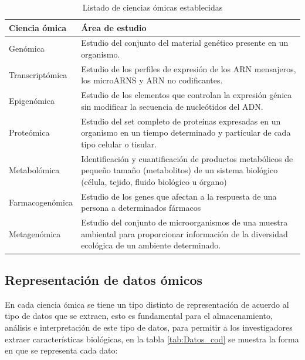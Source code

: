 \begin{table}[!h]
    \scriptsize
    \centering
    \caption{Listado de ciencias ómicas establecidas}
    
    \begin{tabular}{
    >{\centering\arraybackslash}m{4cm} 
    >{\centering\arraybackslash}m{9cm}}
\hline 
        \textbf{Ciencia ómica} & 
        \textbf{Área de estudio}
\\      
    \hline \hline 

    Genómica &
    Estudio del conjunto del material genético presente en un organismo.
\\
    \hline
    Transcriptómica &
    Estudio de los perfiles de expresión de los ARN mensajeros, los microARNS y ARN no codificantes.
\\
    \hline
    Epigenómica &
    Estudio de los elementos que controlan la expresión génica sin modificar la secuencia de nucleótidos del ADN.
\\
    \hline
     Proteómica &
     Estudio del set completo de proteínas expresadas en un organismo en un tiempo determinado y particular de cada tipo celular o tisular.
\\
     \hline
     Metabolómica &
     Identificación y cuantificación de productos metabólicos de pequeño tamaño (metabolitos) de un sistema biológico (célula, tejido, fluido biológico u órgano)
\\
     \hline
     Farmacogenómica &
     Estudio de los genes que afectan a la respuesta de una persona a determinados fármacos
\\
     \hline
     Metagenómica &
     Estudio del conjunto de microorganismos de una muestra ambiental para proporcionar información de la diversidad ecológica de un ambiente determinado.
\\
    
\hline
    \end{tabular}
    \label{tab:List_omic}
\end{table}

\subsection{Representación de datos ómicos}

En cada ciencia ómica se tiene un tipo distinto de representación de acuerdo al tipo de datos que se extraen, esto es fundamental para el almacenamiento, análisis e interpretación de este tipo de datos, para permitir a los investigadores extraer características biológicas, en la tabla \ref{tab:Datos_cod} se muestra la forma en que se representa cada dato:

